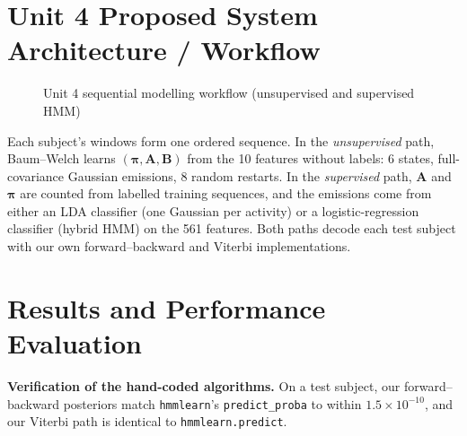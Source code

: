 \section{Unit 4 Proposed System Architecture / Workflow}
\begin{figure}[H]
\centering
{}
\caption{Unit 4 sequential modelling workflow (unsupervised and supervised HMM)}
\label{fig:wf4}
\end{figure}
Each subject's windows form one ordered sequence. In the \emph{unsupervised} path, Baum–Welch learns
$(\boldsymbol\pi,\mathbf A,\mathbf B)$ from the 10 features without labels: 6 states, full-covariance Gaussian emissions,
8 random restarts. In the \emph{supervised} path, $\mathbf A$ and $\boldsymbol\pi$ are counted from labelled training
sequences, and the emissions come from either an LDA classifier (one Gaussian per activity) or a logistic-regression
classifier (hybrid HMM) on the 561 features. Both paths decode each test subject with our own forward–backward and
Viterbi implementations.

\section{Results and Performance Evaluation}
\textbf{Verification of the hand-coded algorithms.} On a test subject, our forward–backward posteriors match
\texttt{hmmlearn}'s \texttt{predict\_proba} to within $1.5\times10^{-10}$, and our Viterbi path is identical to
\texttt{hmmlearn.predict}.

